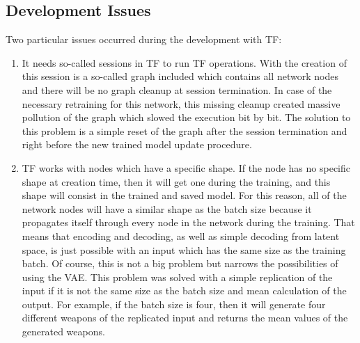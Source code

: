 \documentclass[MGS,Master,english]{twbook}%
\begin{document}
\subsection{Development Issues}
Two particular issues occurred during the development with \ac{TF}:
\begin{enumerate}
	\item It needs so-called sessions in \ac{TF} to run \ac{TF} operations. With the creation of this session is a so-called graph included which contains all network nodes and there will be no graph cleanup at session termination. In case of the necessary retraining for this network, this missing cleanup created massive pollution of the graph which slowed the execution bit by bit. The solution to this problem is a simple reset of the graph after the session termination and right before the new trained model update procedure.
	\item \ac{TF} works with nodes which have a specific shape. If the node has no specific shape at creation time, then it will get one during the training, and this shape will consist in the trained and saved model. For this reason, all of the network nodes will have a similar shape as the batch size because it propagates itself through every node in the network during the training. That means that encoding and decoding, as well as simple decoding from latent space, is just possible with an input which has the same size as the training batch. Of course, this is not a big problem but narrows the possibilities of using the \ac{VAE}. This problem was solved with a simple replication of the input if it is not the same size as the batch size and mean calculation of the output. For example, if the batch size is four, then it will generate four different weapons of the replicated input and returns the mean values of the generated weapons.
\end{enumerate}
\end{document}
